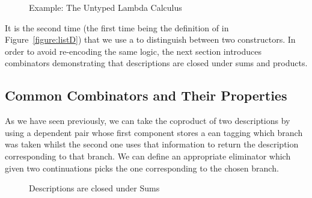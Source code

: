 \begin{figure}[h]
\begin{minipage}{0.55\textwidth}
\end{minipage}
\begin{minipage}{0.35\textwidth}
\end{minipage}

\begin{minipage}{0.30\textwidth}
\end{minipage}
\begin{minipage}{0.30\textwidth}
\end{minipage}\hspace{2em}
\begin{minipage}{0.30\textwidth}
\end{minipage}
\caption{Example: The Untyped Lambda Calculus}
\end{figure}

It is the second time (the first time being the definition of
 in Figure~\ref{figure:listD}) that we use a
 to distinguish between two constructors. In order
to avoid re-encoding the same logic,
the next section introduces combinators demonstrating that
descriptions are closed under sums and products.

\subsection{Common Combinators and Their Properties}\label{desccomb}

As we have seen previously, we can take the coproduct of two
descriptions by using a dependent pair whose first component
stores a ean tagging which branch was taken whilst
the second one uses that information to return the description
corresponding to that branch. We can define an appropriate
eliminator  which given two continuations picks the
one corresponding to the chosen branch.

\begin{figure}[h]
\begin{minipage}{0.45\textwidth}
\end{minipage}\hspace{2em}
\begin{minipage}{0.45\textwidth}
\end{minipage}
\caption{Descriptions are closed under Sums}
\end{figure}

